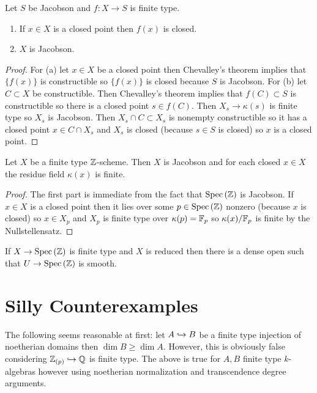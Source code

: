 \documentclass[12pt]{article}
\begin{document}
\begin{prop}
Let $S$ be Jacobson and $f : X \to S$ is finite type. 
\begin{enumerate}
\item If $x \in X$ is a closed point then $f(x)$ is closed.
\item $X$ is Jacobson.
\end{enumerate}
\end{prop}

\begin{proof}
For (a) let $x \in X$ be a closed point then Chevalley's theorem implies that $\{ f(x) \}$ is constructible so $\{ f(x) \}$ is closed because $S$ is Jacobson. For (b) let $C \subset X$ be constructible. Then Chevalley's theorem implies that $f(C) \subset S$ is constructible so there is a closed point $s \in f(C)$. Then $X_s \to \kappa(s)$ is finite type so $X_s$ is Jacobson. Then $X_s \cap C \subset X_s$ is nonempty constructible so it has a closed point $x \in C \cap X_s$ and $X_s$ is closed (because $s \in S$ is closed) so $x$ is a closed point.
\end{proof}

\begin{cor}
Let $X$ be a finite type $\mathbb{Z}$-scheme. Then $X$ is Jacobson and for each closed $x \in X$ the residue field $\kappa(x)$ is finite.
\end{cor}

\begin{proof}
The first part is immediate from the fact that $\mathrm{Spec}\left( \mathbb{Z} \right)$ is Jacobson. If $x \in X$ is a closed point then it lies over some $p \in \mathrm{Spec}\left( \mathbb{Z} \right)$ nonzero (because $x$ is closed) so $x \in X_p$ and $X_p$ is finite type over $\kappa(p) = \mathbb{F}_p$ so $\kappa(x) / \mathbb{F}_p$ is finite by the Nullstellensatz.
\end{proof}

\begin{prop}
If $X \to \mathrm{Spec}\left( \mathbb{Z} \right)$ is finite type and $X$ is reduced then there is a dense open such that $U \to \mathrm{Spec}\left( \mathbb{Z} \right)$ is smooth.
\end{prop}


\section{Silly Counterexamples}

\begin{example}
The following seems reasonable at first: let $A \hookrightarrow B$ be a finite type injection of noetherian domains then $\dim{B} \ge \dim{A}$. However, this is obviously false considering $\mathbb{Z}_{(p)} \hookrightarrow \mathbb{Q}$ is finite type. The above is true for $A, B$ finite type $k$-algebras however using noetherian normalization and transcendence degree arguments. 
\end{example}
\end{document}
